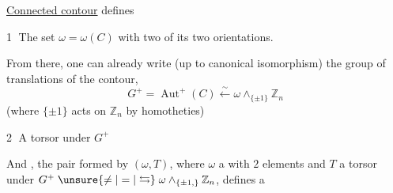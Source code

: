 \uline{Connected  contour}  defines

\textcircled{1} The set $\omega=\omega(C)$ with two  of its two orientations.

From there, one can already write (up to canonical isomorphism) the group of translations of the contour, 
\[
 G^+=\operatorname{Aut}^+(C)\xleftarrow{\sim}\omega\wedge_{\{\pm1\}}\mathbb Z_n
\]
(where $\{\pm1\}$ acts on $\mathbb Z_n$ by homotheties)

\textcircled{2} A torsor under $G^+$

 And , the pair formed by $(\omega,T)$, where $\omega$ a  with $2$ elements and $T$ a torsor under $G^+\mathrel{\unsure{\ne|=|\leftrightarrows}}\omega\wedge_{\{\pm1,\}}\mathbb Z_n$, defines a
